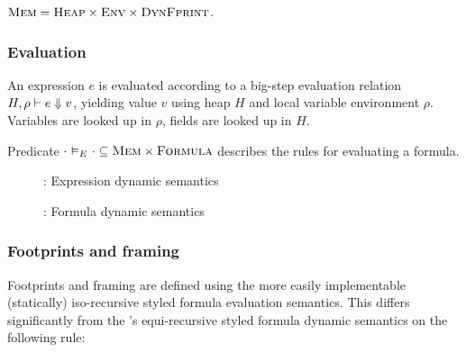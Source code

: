 \documentclass {llncs}
\begin{document}
$\textup{\textsc{Mem}} = \textup{\textsc{Heap}} \times \textup{\textsc{Env}} \times \textup{\textsc{DynFprint}}$.
%

\subsubsection{Evaluation} \label{sec:svlrp-equi-eval}

An expression $e$ is evaluated according to a big-step evaluation relation $H,\rho \vdash e \Downarrow v$, yielding value $v$ using heap $H$ and local variable environment $\rho$. Variables are looked up in $\rho$, fields are looked up in $H$.

Predicate $\cdot \,\,{\vDash_{E}}\,\, \cdot \subseteq \textup{\textsc{Mem}} \times \textup{\textsc{Formula}}$ describes the rules for evaluating a formula.

\begin{figure}[ht!]
    \begin{scenter}
        
    \end{scenter}
    \caption{\svlrp: Expression dynamic semantics}
    \label{fig:svlrp-evalexpr}
\end{figure}
\clearpage
\begin{figure}
    \begin{scenter}
        
    \end{scenter}
    \caption{\svlrp: Formula dynamic semantics}
    \label{fig:svlrp-equi-evalphi}
\end{figure}

\subsubsection{Footprints and framing} \label{sec:svlrp-equi-frm}
\hspace{5cm}


Footprints and framing are defined using the more easily implementable (statically) iso-recursive styled formula evaluation semantics. This differs significantly from the \svlrp's equi-recursive styled formula dynamic semantics on the following rule:
\end{document}
